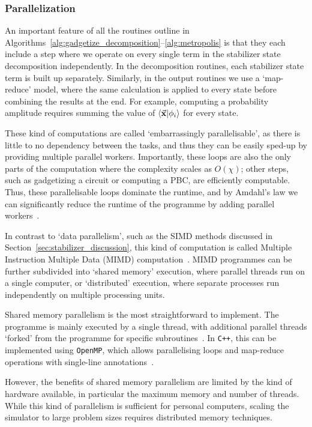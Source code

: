 \subsubsection*{Parallelization}
An important feature of all the routines outline in Algorithms~\ref{alg:gadgetize_decomposition}--\ref{alg:metropolis} is that they each include a step where we operate on every single term in the stabilizer state decomposition independently. In the decomposition routines, each stabilizer state term is built up separately. Similarly, in the output routines we use a `map-reduce' model, where the same calculation is applied to every state before combining the results at the end. For example, computing a probability amplitude requires summing the value of $\braket{\va{x}}{\phi_{i}}$ for every state.\par
These kind of computations are called `embarrassingly parallelisable', as there is little to no dependency between the tasks, and thus they can be easily sped-up by providing multiple parallel workers. Importantly, these loops are also the only parts of the computation where the complexity scales as $O(\chi)$; other steps, such as gadgetizing a circuit or computing a PBC, are efficiently computable. Thus, these parallelisable loops dominate the runtime, and by Amdahl's law we can significantly reduce the runtime of the programme by adding parallel workers~\cite{Amdahl1967}.\par
In contrast to `data parallelism', such as the SIMD methods discussed in Section~\ref{sec:stabilizer_discussion}, this kind of computation is called Multiple Instruction Multiple Data (MIMD) computation~\cite{Flynn1972}. MIMD programmes can be further subdivided into `shared memory' execution, where parallel threads run on a single computer, or `distributed' execution, where separate processes run independently on multiple processing units.\par
Shared memory parallelism is the most straightforward to implement. The programme is mainly executed by a single thread, with additional parallel threads `forked' from the programme for specific subroutines~\cite{Kessler2007}. In \texttt{C++}, this can be implemented using \texttt{OpenMP}, which allows parallelising loops and map-reduce operations with single-line annotations~\cite{OpenMP}.\par
However, the benefits of shared memory parallelism are limited by the kind of hardware available, in particular the maximum memory and number of threads. While this kind of parallelism is sufficient for personal computers, scaling the simulator to large problem sizes requires distributed memory techniques.\par
